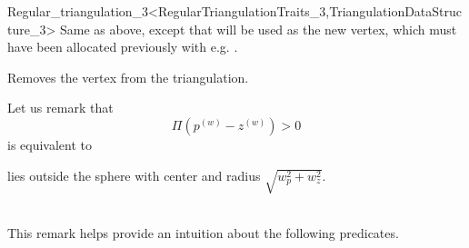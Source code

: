 \begin{ccRefClass}{Regular_triangulation_3<RegularTriangulationTraits_3,TriangulationDataStructure_3>}
{ Same as above, except that  will be used as the new vertex, which
  must have been allocated previously with e.g. .}



{Removes the vertex  from the triangulation.}


Let us remark that 
\[\Pi({p}^{(w)}-{z}^{(w)}) > 0\]
is equivalent to\\
\centerline{ lies outside the sphere with center  and radius
$\sqrt{w_p^2+w_z^2}$.}\\
This remark helps provide an intuition about the following predicates.


\end{ccRefClass}
